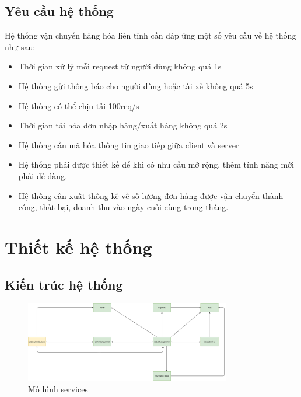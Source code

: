     \subsection{Yêu cầu hệ thống}
    Hệ thống vận chuyển hàng hóa liên tỉnh cần đáp ứng một số yêu cầu về hệ thống như sau:
        \begin{itemize}
            \item Thời gian xử lý mỗi request từ người dùng không quá 1s
            \item Hệ thống gửi thông báo cho người dùng hoặc tài xế  không quá 5s
            \item Hệ thống có thể chịu tải 100req/s
            \item Thời gian tải hóa đơn nhập hàng/xuất hàng không quá 2s
            \item Hệ thống cần mã hóa thông tin giao tiếp giữa client và server
            \item Hệ thống phải được thiết kế để khi có nhu cầu mở rộng, thêm tính năng mới phải dễ dàng.
            \item Hệ thống cân xuất thống kê về số lượng đơn hàng được vận chuyển thành công, thất bại, doanh thu vào ngày cuối cùng trong tháng.
        \end{itemize}

\section{Thiết kế hệ thống}

\subsection{Kiến trúc hệ thống}

		\begin{figure}[!ht]
			\includegraphics[width=0.8\textwidth]{Images/architecture.png}
			\centering
			\linebreak
			\caption{Mô hình services}
		\end{figure}
		
